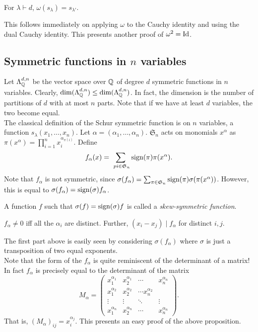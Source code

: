 	\begin{fcor}
		For $\lambda \vdash d$, $\omega(s_\lambda) = s_{\lambda'}$.
	\end{fcor}

	This follows immediately on applying $\omega$ to the Cauchy identity and using the dual Cauchy identity. This presents another proof of $\omega^2 = \operatorname{Id}$.

\subsection{Symmetric functions in $n$ variables}

	Let $\Lambda_{\mathbb{Q}}^{d,n}$ be the vector space over $\mathbb{Q}$ of degree $d$ symmetric functions in $n$ variables. Clearly, $\dim(\Lambda_{\mathbb{Q}}^{d,n}) \le \dim(\Lambda_{\mathbb{Q}}^{d,n})$. In fact, the dimension is the number of partitions of $d$ with at most $n$ parts. Note that if we have at least $d$ variables, the two become equal.\\
	The classical definition of the Schur symmetric function is on $n$ variables, a function $s_\lambda(x_1,\ldots,x_n)$. Let $\alpha = (\alpha_1,\ldots,\alpha_n)$. $\mathfrak{S}_n$ acts on monomials $x^{\alpha}$ as $\pi(x^\alpha) = \prod_{i=1}^n x_i^{\alpha_{\pi(i)}}$.
	Define
	\[ f_\alpha(x) = \sum_{\ pi \in \mathfrak{S}_n} \operatorname{sign}(\pi) \pi(x^\alpha). \]
	Note that $f_\alpha$ is not symmetric, since $\sigma(f_\alpha) = \sum_{\pi \in \mathfrak{S}_n} \operatorname{sign}(\pi) \sigma(\pi(x^\alpha))$. However, this is equal to $\sigma(f_\alpha) = \operatorname{sign}(\sigma) f_\alpha$.

	\begin{fdef}
		A function $f$ such that $\sigma(f) = \operatorname{sign}(\sigma) f$ is called a \emph{skew-symmetric function}.
	\end{fdef}

	\begin{fprop}
		$f_\alpha \ne 0$ iff all the $\alpha_i$ are distinct. Further, $(x_i - x_j) \mid f_\alpha$ for distinct $i,j$.
	\end{fprop}
	The first part above is easily seen by considering $\sigma(f_\alpha)$ where $\sigma$ is just a transposition of two equal exponents.\\

	Note that the form of the $f_\alpha$ is quite reminiscent of the determinant of a matrix! In fact $f_\alpha$ is precisely equal to the determinant of the matrix
	\[ M_\alpha = \begin{pmatrix} x_1^{\alpha_1} & x_2^{\alpha_1} & \cdots & x_n^{\alpha_n} \\ x_1^{\alpha_2} & x_2^{\alpha_2} & \cdots x_n^{\alpha_2} \\ \vdots & \vdots & \ddots & \vdots \\ x_1^{\alpha_n} & x_2^{\alpha_n} & \cdots & x_n^{\alpha_n} \end{pmatrix}. \]
	That is, $(M_\alpha)_{ij} = x_i^{\alpha_j}$. This presents an easy proof of the above proposition.\\

